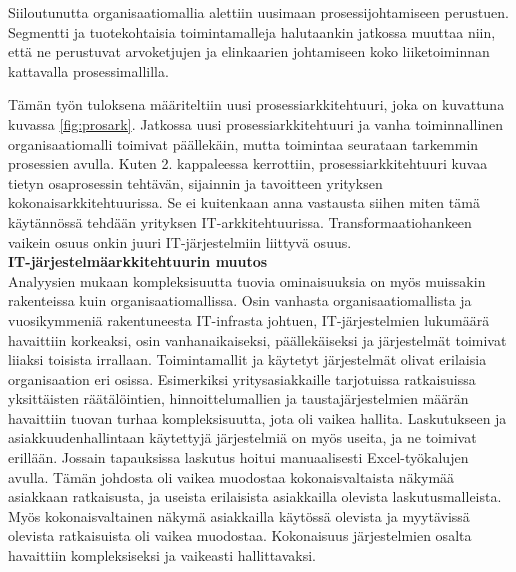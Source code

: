 \documentclass[finnish,12pt,a4paper,pdftex]{article}
\begin{document}
\noindent Siiloutunutta organisaatiomallia alettiin uusimaan prosessijohtamiseen perustuen.
Segmentti ja tuotekohtaisia toimintamalleja halutaankin jatkossa muuttaa niin, että ne perustuvat arvoketjujen ja elinkaarien johtamiseen koko liiketoiminnan kattavalla prosessimallilla. 

Tämän työn tuloksena määriteltiin uusi prosessiarkkitehtuuri, joka on kuvattuna kuvassa \ref{fig:prosark}. Jatkossa uusi prosessiarkkitehtuuri ja vanha toiminnallinen organisaatiomalli toimivat päällekäin, mutta toimintaa seurataan tarkemmin prosessien avulla. Kuten 2. kappaleessa kerrottiin, prosessiarkkitehtuuri kuvaa tietyn osaprosessin tehtävän, sijainnin ja tavoitteen yrityksen kokonaisarkkitehtuurissa. Se ei kuitenkaan anna vastausta siihen miten tämä käytännössä tehdään yrityksen IT-arkkitehtuurissa. Transformaatiohankeen vaikein osuus onkin juuri IT-järjestelmiin liittyvä osuus.\\

\textbf{IT-järjestelmäarkkitehtuurin muutos}\\

\noindent Analyysien mukaan kompleksisuutta tuovia ominaisuuksia on myös muissakin rakenteissa kuin organisaatiomallissa. Osin vanhasta organisaatiomallista ja vuosikymmeniä rakentuneesta IT-infrasta johtuen, IT-järjestelmien lukumäärä havaittiin korkeaksi, osin vanhanaikaiseksi, päällekäiseksi ja järjestelmät toimivat liiaksi toisista irrallaan. Toimintamallit ja käytetyt järjestelmät olivat erilaisia organisaation eri osissa. Esimerkiksi yritysasiakkaille tarjotuissa ratkaisuissa yksittäisten räätälöintien, hinnoittelumallien ja taustajärjestelmien määrän havaittiin tuovan turhaa kompleksisuutta, jota oli vaikea hallita. Laskutukseen ja asiakkuudenhallintaan käytettyjä järjestelmiä on myös useita, ja ne toimivat erillään. Jossain tapauksissa laskutus hoitui manuaalisesti Excel-työkalujen avulla. Tämän johdosta oli vaikea muodostaa kokonaisvaltaista näkymää asiakkaan ratkaisusta, ja useista erilaisista asiakkailla olevista laskutusmalleista. Myös kokonaisvaltainen näkymä asiakkailla käytössä olevista ja myytävissä olevista ratkaisuista oli vaikea muodostaa. Kokonaisuus järjestelmien osalta havaittiin kompleksiseksi ja vaikeasti hallittavaksi.\\
\end{document}
